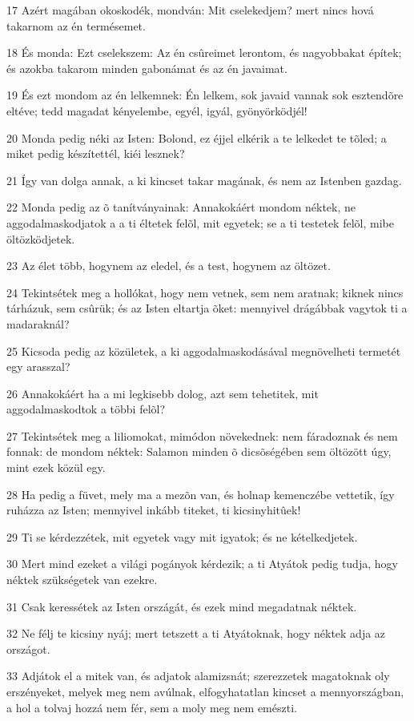 \par 17 Azért magában okoskodék, mondván: Mit cselekedjem? mert nincs hová takarnom az én termésemet.
\par 18 És monda: Ezt cselekszem: Az én csûreimet lerontom, és nagyobbakat építek; és azokba takarom minden gabonámat és az én javaimat.
\par 19 És ezt mondom az én lelkemnek: Én lelkem, sok javaid vannak sok esztendõre eltéve; tedd magadat kényelembe, egyél, igyál, gyönyörködjél!
\par 20 Monda pedig néki az Isten: Bolond, ez éjjel elkérik a te lelkedet te tõled; a miket pedig készítettél, kiéi lesznek?
\par 21 Így van dolga annak, a ki kincset takar magának, és nem az Istenben gazdag.
\par 22 Monda pedig az õ tanítványainak: Annakokáért mondom néktek, ne aggodalmaskodjatok a a ti éltetek felõl, mit egyetek; se a ti testetek felõl, mibe öltözködjetek.
\par 23 Az élet több, hogynem az eledel, és a test, hogynem az öltözet.
\par 24 Tekintsétek meg a hollókat, hogy nem vetnek, sem nem aratnak; kiknek nincs tárházuk, sem csûrük; és az Isten eltartja õket: mennyivel drágábbak vagytok ti a madaraknál?
\par 25 Kicsoda pedig az közületek, a ki aggodalmaskodásával megnövelheti termetét egy arasszal?
\par 26 Annakokáért ha a mi legkisebb dolog, azt sem tehetitek, mit aggodalmaskodtok a többi felõl?
\par 27 Tekintsétek meg a liliomokat, mimódon növekednek: nem fáradoznak és nem fonnak: de mondom néktek: Salamon minden õ dicsõségében sem öltözött úgy, mint ezek közül egy.
\par 28 Ha pedig a füvet, mely ma a mezõn van, és holnap kemenczébe vettetik, így ruházza az Isten; mennyivel inkább titeket, ti kicsinyhitûek!
\par 29 Ti se kérdezzétek, mit egyetek vagy mit igyatok; és ne kételkedjetek.
\par 30 Mert mind ezeket a világi pogányok kérdezik; a ti Atyátok pedig tudja, hogy néktek szükségetek van ezekre.
\par 31 Csak keressétek az Isten országát, és ezek  mind megadatnak néktek.
\par 32 Ne félj te kicsiny nyáj; mert tetszett a ti Atyátoknak, hogy néktek adja az országot.
\par 33 Adjátok el a mitek van, és adjatok alamizsnát; szerezzetek magatoknak oly erszényeket, melyek meg nem avúlnak, elfogyhatatlan  kincset a mennyországban, a hol a tolvaj hozzá nem fér, sem a moly meg nem emészti.
